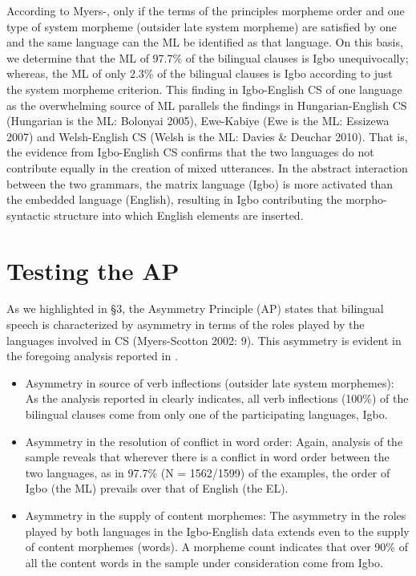 \documentclass[output=paper]{langsci/langscibook}
\begin{document}
According to Myers-\citet[59]{Scotton2002}, only if the terms of the principles morpheme order and one type of system morpheme (outsider late system morpheme) are satisfied by one and the same language can the ML be identified as that language. On this basis, we determine that the ML of 97.7\% of the bilingual clauses is Igbo unequivocally; whereas, the ML of only 2.3\% of the bilingual clauses is Igbo according to just the system morpheme criterion. This finding in Igbo-English CS of one language as the overwhelming source of ML parallels the findings in Hungarian-English CS (Hungarian is the ML: Bolonyai 2005), Ewe-Kabiye (Ewe is the ML: Essizewa 2007) and Welsh-English CS (Welsh is the ML: Davies \& Deuchar 2010). That is, the evidence from Igbo-English CS confirms that the two languages do not contribute equally in the creation of mixed utterances. In the abstract interaction between the two grammars, the matrix language (Igbo) is more activated than the embedded language (English), resulting in Igbo contributing the morpho-syntactic structure into which English elements are inserted.  

\section{Testing the AP}

As we highlighted in §3, the Asymmetry Principle (AP) states that bilingual speech is characterized by asymmetry in terms of the roles played by the languages involved in CS (Myers-Scotton 2002: 9). This asymmetry is evident in the foregoing analysis reported in . 

\begin{itemize}
 \item Asymmetry in source of verb inflections (outsider late system morphemes): As the analysis reported in  clearly indicates, all verb inflections (100\%) of the bilingual clauses come from only one of the participating languages, Igbo.

 \item Asymmetry in the resolution of conflict in word order: Again, analysis of the sample reveals that wherever there is a conflict in word order between the two languages, as in 97.7\% (N = 1562/1599) of the examples, the order of Igbo (the ML) prevails over that of English (the EL). 

 \item Asymmetry in the supply of content morphemes: The asymmetry in the roles played by both languages in the Igbo-English data extends even to the supply of content morphemes (words). A morpheme count indicates that over 90\% of all the content words in the sample under consideration come from Igbo.
 
\end{itemize}
 
\end{document}

